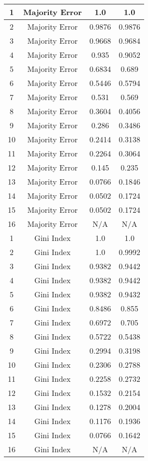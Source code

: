 \documentclass[8pt, fullpage,letterpaper]{article}
\begin{document}
\begin{enumerate}
\begin{enumerate}
\begin{center}
\begin{tabular}{c|c|c|c}
				1 & Majority Error 		& 1.0 & 1.0  \\ \hline
				2 & Majority Error 		& 0.9876 & 0.9876  \\ \hline
				3 & Majority Error 		& 0.9668 & 0.9684  \\ \hline
				4 & Majority Error		& 0.935 & 0.9052  \\ \hline
				5 & Majority Error 		& 0.6834 & 0.689  \\ \hline
				6 & Majority Error 		& 0.5446 & 0.5794  \\ \hline
				7 & Majority Error 		& 0.531 & 0.569  \\ \hline
				8 & Majority Error 		& 0.3604 & 0.4056  \\ \hline
				9 & Majority Error 		& 0.286 & 0.3486  \\ \hline
				10 & Majority Error 		& 0.2414 & 0.3138  \\ \hline
				11 & Majority Error 		& 0.2264 & 0.3064  \\ \hline
				12 & Majority Error 		& 0.145 & 0.235  \\ \hline
				13 & Majority Error 		& 0.0766 & 0.1846  \\ \hline
				14 & Majority Error 		& 0.0502 & 0.1724  \\ \hline
				15 & Majority Error 		& 0.0502 & 0.1724  \\ \hline
				16 & Majority Error 		& N/A & N/A  \\ \hline\hline

				1 & Gini Index 			& 1.0 & 1.0  \\ \hline
				2 & Gini Index 			& 1.0 & 0.9992  \\ \hline
				3 & Gini Index 			& 0.9382 & 0.9442  \\ \hline
				4 & Gini Index 			& 0.9382 & 0.9442  \\ \hline
				5 & Gini Index 			& 0.9382 & 0.9432  \\ \hline
				6 & Gini Index 			& 0.8486 & 0.855  \\ \hline
				7 & Gini Index 			& 0.6972 & 0.705  \\ \hline
				8 & Gini Index 			& 0.5722 & 0.5438  \\ \hline
				9 & Gini Index 			& 0.2994 & 0.3198  \\ \hline
				10 & Gini Index 			& 0.2306 & 0.2788  \\ \hline
				11 & Gini Index 			& 0.2258 & 0.2732  \\ \hline
				12 & Gini Index 			& 0.1532 & 0.2154  \\ \hline
				13 & Gini Index 			& 0.1278 & 0.2004  \\ \hline
				14 & Gini Index 			& 0.1176 & 0.1936  \\ \hline
				15 & Gini Index 			& 0.0766 & 0.1642  \\ \hline
				16 & Gini Index 			& N/A & N/A  \\ \hline\hline


\end{tabular}
\end{center}
\end{enumerate}
\end{enumerate}
\end{document}
